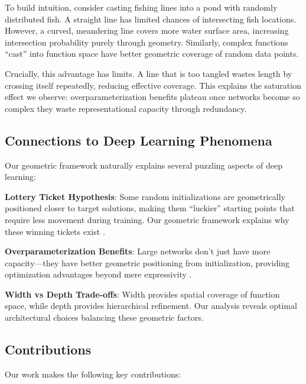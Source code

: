 To build intuition, consider casting fishing lines into a pond with randomly distributed fish. A straight line has limited chances of intersecting fish locations. However, a curved, meandering line covers more water surface area, increasing intersection probability purely through geometry. Similarly, complex functions ``cast'' into function space have better geometric coverage of random data points.

Crucially, this advantage has limits. A line that is too tangled wastes length by crossing itself repeatedly, reducing effective coverage. This explains the saturation effect we observe: overparameterization benefits plateau once networks become so complex they waste representational capacity through redundancy.

\subsection{Connections to Deep Learning Phenomena}

Our geometric framework naturally explains several puzzling aspects of deep learning:

\textbf{Lottery Ticket Hypothesis}: Some random initializations are geometrically positioned closer to target solutions, making them ``luckier'' starting points that require less movement during training. Our geometric framework explains why these winning tickets exist \cite{Frankle2018TheLT, Zhou2019DeconstructingLT}.

\textbf{Overparameterization Benefits}: Large networks don't just have more capacity---they have better geometric positioning from initialization, providing optimization advantages beyond mere expressivity \cite{Belkin2018ReconcilingMM, Neyshabur2017ExploringGI, AllenZhu2018LearningAG}.

\textbf{Width vs Depth Trade-offs}: Width provides spatial coverage of function space, while depth provides hierarchical refinement. Our analysis reveals optimal architectural choices balancing these geometric factors.

\subsection{Contributions}

Our work makes the following key contributions:

